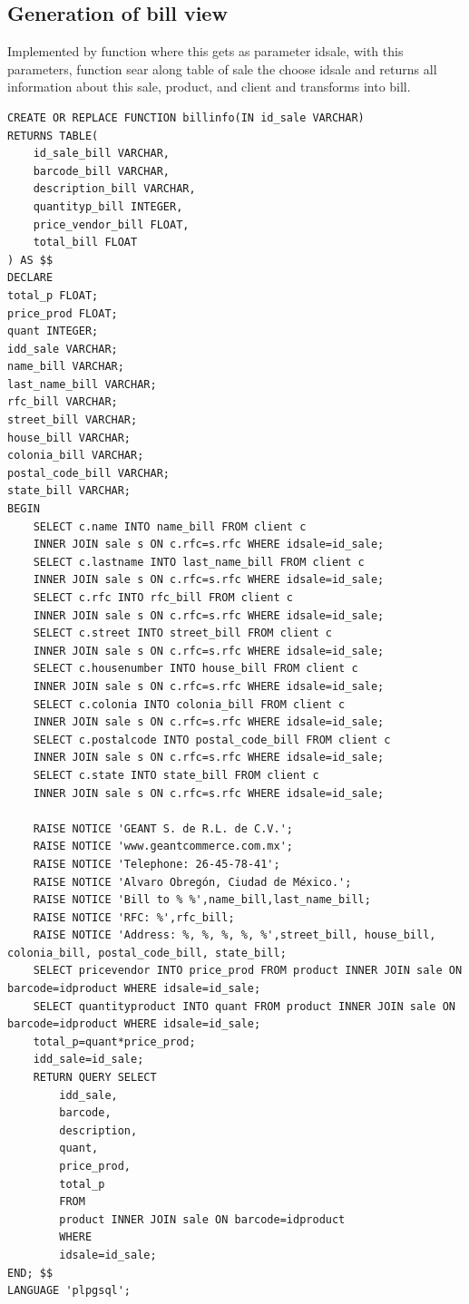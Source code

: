 \documentclass{article}
\begin{document}
\subsection{Generation of bill view}
Implemented by function where this gets as parameter idsale, with this parameters, function sear along table of sale the choose idsale and returns all information about this sale, product, and client and transforms into bill. 
\begin{verbatim}
CREATE OR REPLACE FUNCTION billinfo(IN id_sale VARCHAR)
RETURNS TABLE(
    id_sale_bill VARCHAR,
    barcode_bill VARCHAR,
    description_bill VARCHAR,
    quantityp_bill INTEGER,
    price_vendor_bill FLOAT,
    total_bill FLOAT
) AS $$
DECLARE
total_p FLOAT;
price_prod FLOAT;
quant INTEGER;
idd_sale VARCHAR;
name_bill VARCHAR;
last_name_bill VARCHAR;
rfc_bill VARCHAR;
street_bill VARCHAR;
house_bill VARCHAR;
colonia_bill VARCHAR;
postal_code_bill VARCHAR;
state_bill VARCHAR;
BEGIN
    SELECT c.name INTO name_bill FROM client c 
    INNER JOIN sale s ON c.rfc=s.rfc WHERE idsale=id_sale;
    SELECT c.lastname INTO last_name_bill FROM client c 
    INNER JOIN sale s ON c.rfc=s.rfc WHERE idsale=id_sale;
    SELECT c.rfc INTO rfc_bill FROM client c 
    INNER JOIN sale s ON c.rfc=s.rfc WHERE idsale=id_sale;
    SELECT c.street INTO street_bill FROM client c 
    INNER JOIN sale s ON c.rfc=s.rfc WHERE idsale=id_sale;
    SELECT c.housenumber INTO house_bill FROM client c 
    INNER JOIN sale s ON c.rfc=s.rfc WHERE idsale=id_sale;
    SELECT c.colonia INTO colonia_bill FROM client c 
    INNER JOIN sale s ON c.rfc=s.rfc WHERE idsale=id_sale;
    SELECT c.postalcode INTO postal_code_bill FROM client c 
    INNER JOIN sale s ON c.rfc=s.rfc WHERE idsale=id_sale;
    SELECT c.state INTO state_bill FROM client c 
    INNER JOIN sale s ON c.rfc=s.rfc WHERE idsale=id_sale;

    RAISE NOTICE 'GEANT S. de R.L. de C.V.';
    RAISE NOTICE 'www.geantcommerce.com.mx';
    RAISE NOTICE 'Telephone: 26-45-78-41';
    RAISE NOTICE 'Alvaro Obregón, Ciudad de México.';
    RAISE NOTICE 'Bill to % %',name_bill,last_name_bill;
    RAISE NOTICE 'RFC: %',rfc_bill;
    RAISE NOTICE 'Address: %, %, %, %, %',street_bill, house_bill, colonia_bill, postal_code_bill, state_bill;
    SELECT pricevendor INTO price_prod FROM product INNER JOIN sale ON barcode=idproduct WHERE idsale=id_sale;
    SELECT quantityproduct INTO quant FROM product INNER JOIN sale ON barcode=idproduct WHERE idsale=id_sale;
    total_p=quant*price_prod;
    idd_sale=id_sale;
    RETURN QUERY SELECT
        idd_sale,
        barcode,
        description,
        quant,
        price_prod,
        total_p
        FROM
        product INNER JOIN sale ON barcode=idproduct
        WHERE
        idsale=id_sale;
END; $$
LANGUAGE 'plpgsql';
\end{verbatim}
\end{document}
